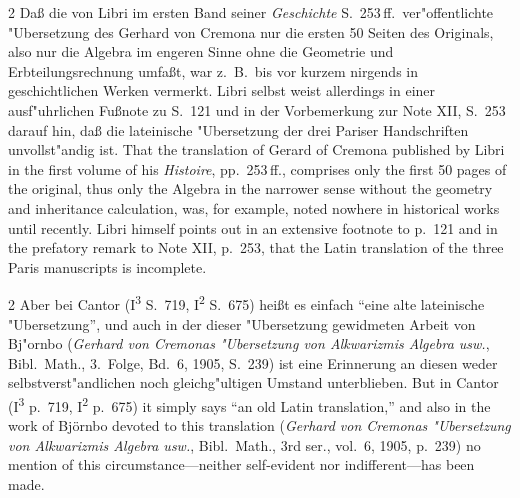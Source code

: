 \documentclass[10pt,a4paper]{article}
\renewcommand{\switchcolumn}{\syncronize\nointerlineskip\columnbreak}
\newcommand{\enquote}[1]{``#1''}
\begin{document}
\begin{paracol}{2}
Da\ss{} die von Libri im ersten Band seiner \textit{Geschichte} S.\ 253\,ff.\ ver"offentlichte "Ubersetzung des Gerhard von Cremona nur die ersten 50 Seiten des Originals, also nur die Algebra im engeren Sinne ohne die Geometrie und Erbteilungsrechnung umfa\ss{}t, war z.\ B.\ bis vor kurzem nirgends in geschichtlichen Werken vermerkt. Libri selbst weist allerdings in einer ausf"uhrlichen Fu\ss{}note zu S.\ 121 und in der Vorbemerkung zur Note XII, S.\ 253 darauf hin, da\ss{} die lateinische "Ubersetzung der drei Pariser Handschriften unvollst"andig ist.
\switchcolumn
That the translation of Gerard of Cremona published by Libri in the first volume of his \textit{Histoire}, pp.\ 253\,ff., comprises only the first 50 pages of the original, thus only the Algebra in the narrower sense without the geometry and inheritance calculation, was, for example, noted nowhere in historical works until recently. Libri himself points out in an extensive footnote to p.\ 121 and in the prefatory remark to Note XII, p.\ 253, that the Latin translation of the three Paris manuscripts is incomplete.
\end{paracol}

\begin{paracol}{2}
Aber bei Cantor (I\textsuperscript{3} S.\ 719, I\textsuperscript{2} S.\ 675) hei\ss{}t es einfach \enquote{eine alte lateinische "Ubersetzung}, und auch in der dieser "Ubersetzung gewidmeten Arbeit von Bj"ornbo (\textit{Gerhard von Cremonas "Ubersetzung von Alkwarizmis Algebra usw.}, Bibl.\ Math., 3.\ Folge, Bd.\ 6, 1905, S.\ 239) ist eine Erinnerung an diesen weder selbstverst"andlichen noch gleichg"ultigen Umstand unterblieben.
\switchcolumn
But in Cantor (I\textsuperscript{3} p.\ 719, I\textsuperscript{2} p.\ 675) it simply says ``an old Latin translation,'' and also in the work of Bj\"ornbo devoted to this translation (\textit{Gerhard von Cremonas "Ubersetzung von Alkwarizmis Algebra usw.}, Bibl.\ Math., 3rd ser., vol.\ 6, 1905, p.\ 239) no mention of this circumstance---neither self-evident nor indifferent---has been made.
\end{paracol}
\end{document}
